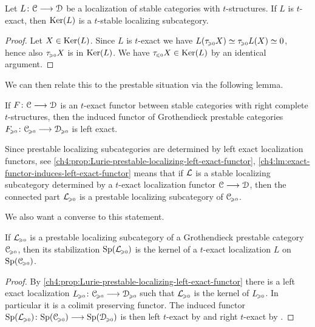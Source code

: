 \begin{lemma}
    \label{ch4:lm:t-exact-then-t-stable-kernel}
    Let $L\:\C\to\D$ be a localization of stable categories with $t$-structures. If $L$ is $t$-exact, then $\Ker(L)$ is a $t$-stable localizing subcategory.  
\end{lemma}
\begin{proof}
    Let $X\in \Ker(L)$. Since $L$ is $t$-exact we have $L(\tau\geqz X)\simeq \tau\geqz L(X)\simeq 0$, hence also $\tau\geqz X$ is in $\Ker(L)$. We have $\tau\leqz X\in \Ker(L)$ by an identical argument.  
\end{proof}

We can then relate this to the prestable situation via the following lemma. 

\begin{lemma}
    \label{ch4:lm:exact-functor-induces-left-exact-functor}
    If $F\:\C\to \D$ is an $t$-exact functor between stable categories with right complete $t$-structures, then the induced functor of Grothendieck prestable categories $F\geqz\:\C\geqz\to\D\geqz$ is left exact. 
\end{lemma}

\begin{remark}
    \label{ch4:rm:kernel-of-t-exact-then-prestable-localizing}
    Since prestable localizing subcategories are determined by left exact localization functors, see \cref{ch4:prop:Lurie-prestable-localizing-left-exact-functor}, \cref{ch4:lm:exact-functor-induces-left-exact-functor} means that if $\L$ is a stable localizing subcategory determined by a $t$-exact localization functor $\C\to \D$, then the connected part $\L\geqz$ is a prestable localizing subcategory of $\C\geqz$. 
\end{remark}

We also want a converse to this statement.

\begin{lemma}
    \label{ch4:lm:prestable-localizing-then-kernel-of-t-exact}
    If $\L\geqz$ is a prestable localizing subcategory of a Grothendieck prestable category $\C\geqz$, then its stabilization $\Sp(\L\geqz)$ is the kernel of a $t$-exact localization $L$ on $\Sp(\C\geqz)$.  
\end{lemma}
\begin{proof}
    By \cref{ch4:prop:Lurie-prestable-localizing-left-exact-functor} there is a left exact localization $L\geqz \: \C\geqz \to \D\geqz$ such that $\L\geqz$ is the kernel of $L\geqz$. In particular it is a colimit preserving functor. The induced functor $\Sp(\L\geqz)\:\Sp(\C\geqz)\to \Sp(\D\geqz)$ is then left $t$-exact by \cite[C.3.2.1]{lurie_SAG} and right $t$-exact by \cite[C.3.1.1]{lurie_SAG}. 
\end{proof}

